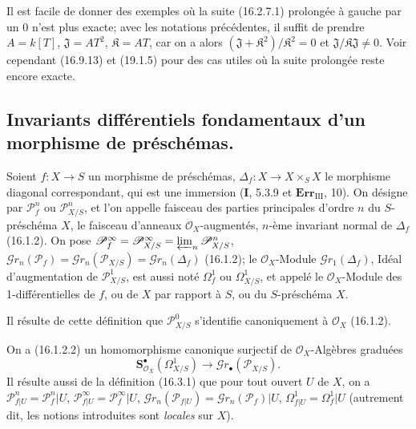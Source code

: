 Il est facile de donner des exemples où la suite (16.2.7.1) prolongée à gauche
par un 0 n'est plus exacte; avec les notations précédentes, il suffit de
prendre $A=k[T]$, $\mathfrak{J}=AT^2$, $\mathfrak{K}=AT$, car on a alors
$(\mathfrak{J}+\mathfrak{K}^2)/\mathfrak{K}^2=0$ et
$\mathfrak{J}/\mathfrak{K}\mathfrak{J}\neq 0$. Voir cependant (16.9.13) et
(19.1.5) pour des cas utiles où la suite prolongée reste encore exacte.

\subsection{Invariants différentiels fondamentaux d'un morphisme de préschémas.}

\begin{definition}[16.3.1]
Soient $f:X\to S$ un morphisme de préschémas, $\Delta_f:X\to X\times_S X$
le morphisme diagonal correspondant, qui est une immersion \textup{(\textbf{I}, 5.3.9} et
\textup{$\mathbf{Err}_{\mathrm{III}}$, 10)}. On désigne par $\mathscr{P}_f^n$ ou
$\mathscr{P}_{X/S}^n$, et l'on appelle \textup{faisceau des parties principales d'ordre $n$
du $S$-préschéma $X$}, le faisceau d'anneaux $\mathcal{O}_X$-augmentés, $n$-ème
invariant normal de $\Delta_f$ \textup{(16.1.2)}. On pose
$\mathscr{P}_f^\infty=\mathscr{P}_{X/S}^\infty=
\varprojlim_n\mathscr{P}_{X/S}^n$,
$\mathscr{G}r_n(\mathscr{P}_f)=\mathscr{G}r_n(\mathscr{P}_{X/S})=
\mathscr{G}r_n(\Delta_f)$ \textup{(16.1.2)}; le $\mathcal{O}_X$-Module
$\mathscr{G}r_1(\Delta_f)$, Idéal d'augmentation de $\mathscr{P}_{X/S}^1$, est
aussi noté $\varOmega_f^1$ ou $\varOmega_{X/S}^1$, et appelé le $\mathcal{O}_X$-Module
des \textup{1-différentielles} de $f$, ou de $X$ par rapport à $S$, ou du $S$-préschéma $X$.
\end{definition}

Il résulte de cette définition que $\mathscr{P}_{X/S}^0$ s'identifie
canoniquement à $\mathcal{O}_X$ (16.1.2).

On a (16.1.2.2) un homomorphisme canonique surjectif de
$\mathcal{O}_X$-Algèbres graduées
\[
  \mathbf{S}_{\mathcal{O}_X}^{\bullet}(\varOmega_{X/S}^1)
  \longrightarrow\mathscr{G}r_\bullet(\mathscr{P}_{X/S}).
  \tag{16.3.1.1}
  \label{IV.16.3.1.1}
\]
Il résulte aussi de la définition (16.3.1) que pour tout ouvert $U$ de $X$, on a
$\mathscr{P}_{f|U}^n=\mathscr{P}_f^n|U$,
$\mathscr{P}_{f|U}^\infty=\mathscr{P}_f^\infty|U$,
$\mathscr{G}r_n(\mathscr{P}_{f|U})=\mathscr{G}r_n(\mathscr{P}_f)|U$,
$\varOmega_{f|U}^1=\varOmega_f^1|U$ (autrement dit, les notions introduites sont
\emph{locales} sur $X$).

